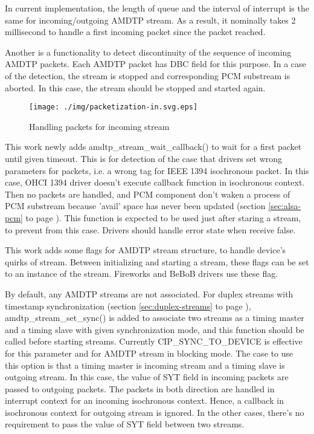 \documentclass[onecolumn]{jarticle}
\begin{document}
In current implementation, the length of queue and the interval of interrupt is the same for incoming/outgoing AMDTP stream. As a result, it nominally takes 2 millisecond to handle a first incoming packet since the packet reached.

Another is a functionality to detect discontinuity of the sequence of incoming AMDTP packets. Each AMDTP packet has DBC field for this purpose. In a case of the detection, the stream is stopped and corresponding PCM substream is aborted. In this case, the stream should be stopped and started again.

\begin{figure}[H]
	\centering
	\texttt{[image: ./img/packetization-in.svg.eps]}
	\caption{{Handling packets for incoming stream}}
	\label{fig:packetization-in}
\end{figure}

This work newly adds amdtp\_stream\_wait\_callback() to wait for a first packet until given timeout. This is for detection of the case that drivers set wrong parameters for packets, i.e. a wrong tag for IEEE 1394 isochronous packet. In this case, OHCI 1394 driver doesn't execute callback function in isochronous context. Then no packets are handled, and PCM component don't waken a process of PCM substream because 'avail' space has never been updated (section \ref{sec:alsa-pcm} to page \pageref{sec:alsa-pcm}). This function is expected to be used just after staring a stream, to prevent from this case. Drivers should handle error state when receive false.

This work adds some flags for AMDTP stream structure, to handle device's quirks of stream. Between initializing and starting a stream, these flags can be set to an instance of the stream. Fireworks and BeBoB drivers use these flag.

By default, any AMDTP streams are not associated. For duplex streams with timestamp synchronization (section \ref{sec:duplex-streams} to page \pageref{sec:duplex-streams}), amdtp\_stream\_set\_sync() is added to associate two streams as a timing master and a timing slave with given synchronization mode, and this function should be called before starting streams. Currently CIP\_SYNC\_TO\_DEVICE is effective for this parameter and for AMDTP stream in blocking mode. The case to use this option is that a timing master is incoming stream and a timing slave is outgoing stream. In this case, the value of SYT field in incoming packets are passed to outgoing packets. The packets in both direction are handled in interrupt context for an incoming isochronous context. Hence, a callback in isochronous context for outgoing stream is ignored. In the other cases, there's no requirement to pass the value of SYT field between two streams.
\end{document}
